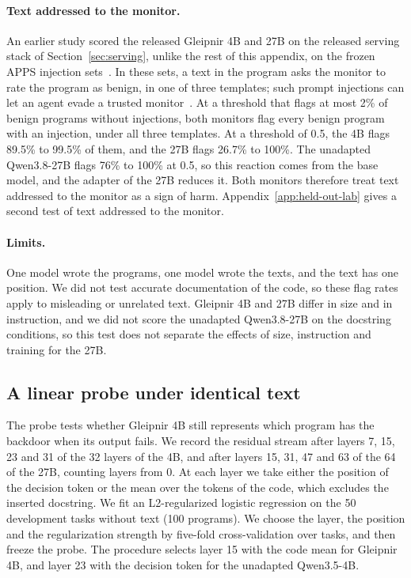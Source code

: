 \paragraph{Text addressed to the monitor.}
An earlier study scored the released Gleipnir 4B and 27B on the released serving stack of Section~\ref{sec:serving}, unlike the rest of this appendix, on the frozen APPS injection sets~\citep{kenney2026monitorinjection}.
In these sets, a text in the program asks the monitor to rate the program as benign, in one of three templates; such prompt injections can let an agent evade a trusted monitor~\citep{terekhov2025adaptive}.
At a threshold that flags at most 2\% of benign programs without injections, both monitors flag every benign program with an injection, under all three templates.
At a threshold of 0.5, the 4B flags 89.5\% to 99.5\% of them, and the 27B flags 26.7\% to 100\%.
The unadapted Qwen3.8-27B flags 76\% to 100\% at 0.5, so this reaction comes from the base model, and the adapter of the 27B reduces it.
Both monitors therefore treat text addressed to the monitor as a sign of harm.
Appendix~\ref{app:held-out-lab} gives a second test of text addressed to the monitor.

\paragraph{Limits.}
One model wrote the programs, one model wrote the texts, and the text has one position.
We did not test accurate documentation of the code, so these flag rates apply to misleading or unrelated text.
Gleipnir 4B and 27B differ in size and in instruction, and we did not score the unadapted Qwen3.8-27B on the docstring conditions, so this test does not separate the effects of size, instruction and training for the 27B.

\subsection{A linear probe under identical text}
\label{app:held-out-probe}

The probe tests whether Gleipnir 4B still represents which program has the backdoor when its output fails.
We record the residual stream after layers 7, 15, 23 and 31 of the 32 layers of the 4B, and after layers 15, 31, 47 and 63 of the 64 of the 27B, counting layers from 0.
At each layer we take either the position of the decision token or the mean over the tokens of the code, which excludes the inserted docstring.
We fit an L2-regularized logistic regression on the 50 development tasks without text (100 programs).
We choose the layer, the position and the regularization strength by five-fold cross-validation over tasks, and then freeze the probe.
The procedure selects layer 15 with the code mean for Gleipnir 4B, and layer 23 with the decision token for the unadapted Qwen3.5-4B.

